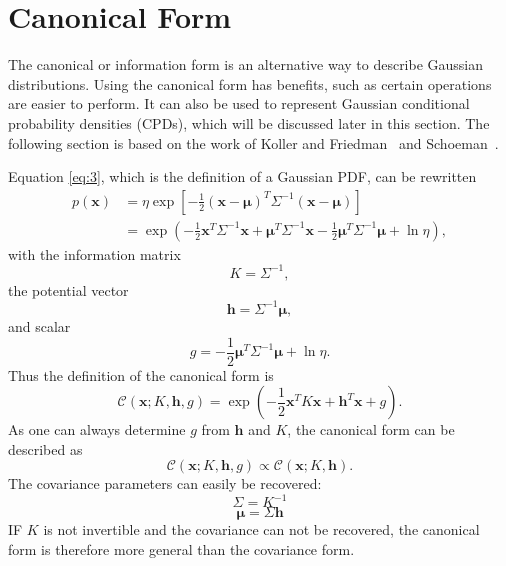 \documentclass[12pt,oneside,openany,a4paper, %
afrikaans,english,
]{memoir}
\numberwithin{equation}{chapter}
\begin{document}
\section{Canonical Form}
The canonical or information form is an alternative way to describe Gaussian distributions. Using the canonical form has benefits, such as certain operations are easier to perform. It can also be used to represent Gaussian conditional probability densities (CPDs), which will be discussed later in this section. The following section is based on the work of Koller and Friedman~\cite{koller} and Schoeman~\citep{JC}.

Equation \ref{eq:3}, which is the definition of a Gaussian PDF, can be rewritten
\begin{equation}
\begin{split}\label{eq:6}
p(\bm{x}) & = \eta\exp\left[-\frac{1}{2}(\bm{x}-\bm{\mu})^T\Sigma^{-1}(\bm{x}-\bm{\mu})\right]\\
& = \exp\left(-\frac{1}{2}\bm{x}^T\Sigma^{-1}\bm{x} + \bm{\mu}^T\Sigma^{-1}\bm{x} - \frac{1}{2}\bm{\mu}^T\Sigma^{-1}\bm{\mu} + \ln{\eta}\right),
\end{split}
\end{equation}
with the information matrix
\begin{equation}\label{eq:7}
K = \Sigma^{-1},
\end{equation}
the potential vector
\begin{equation}\label{eq:8}
\bm{h} = \Sigma^{-1}\bm{\mu},
\end{equation}
and scalar
\begin{equation}\label{eq:9}
g = - \frac{1}{2}\bm{\mu}^T\Sigma^{-1}\bm{\mu} + \ln{\eta}.
\end{equation}
Thus the definition of the canonical form is
\begin{equation}\label{eq:canonical}
\mathcal{C}(\bm{x}; K,\bm{h},g) = \exp\left(-\frac{1}{2}\bm{x}^TK\bm{x} + \bm{h}^T\bm{x} +g \right).
\end{equation}
As one can always determine $g$ from $\bm{h}$ and $K$, the canonical form can be described as
\begin{equation}
\mathcal{C}(\bm{x}; K,\bm{h},g) \propto \mathcal{C}(\bm{x}; K,\bm{h}).
\end{equation}
The covariance parameters can easily be recovered:
\begin{equation}
\Sigma = K^{-1}
\end{equation}
\begin{equation}
\bm{\mu} = \Sigma\bm{h}
\end{equation}
IF $K$ is not invertible and the covariance can not be recovered, the canonical form is therefore more general than the covariance form.
\end{document}
